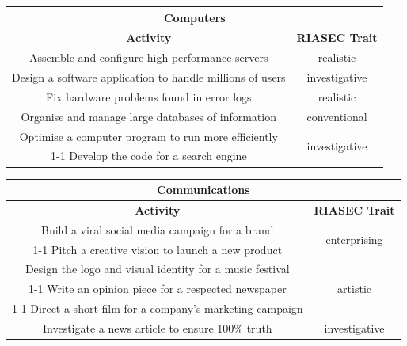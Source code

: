 \begin{table}[H]
\centering
\begin{tabular}{|c|c|}
\hline
\multicolumn{2}{|c|}{\textbf{Computers}}\\
\hline
\hline
\textbf{Activity} & \textbf{RIASEC Trait}\\
\hline
Assemble and configure high-performance servers & realistic\\
\hline
Design a software application to handle millions of users & investigative\\
\hline
Fix hardware problems found in error logs & realistic\\
\hline
Organise and manage large databases of information & conventional\\
\hline
Optimise a computer program to run more efficiently & \multirow{2}{*}{investigative}\\
\cline{1-1}
Develop the code for a search engine & \\
\hline
\end{tabular}
\end{table}

\begin{table}[H]
\centering
\begin{tabular}{|c|c|}
\hline
\multicolumn{2}{|c|}{\textbf{Communications}}\\
\hline
\hline
\textbf{Activity} & \textbf{RIASEC Trait}\\
\hline
Build a viral social media campaign for a brand & \multirow{2}{*}{enterprising}\\
\cline{1-1}
Pitch a creative vision to launch a new product & \\
\hline
Design the logo and visual identity for a music festival & \multirow{3}{*}{artistic}\\
\cline{1-1}
Write an opinion piece for a respected newspaper & \\
\cline{1-1}
Direct a short film for a company's marketing campaign & \\
\hline
Investigate a news article to ensure 100\% truth & investigative\\
\hline
\end{tabular}
\end{table}

